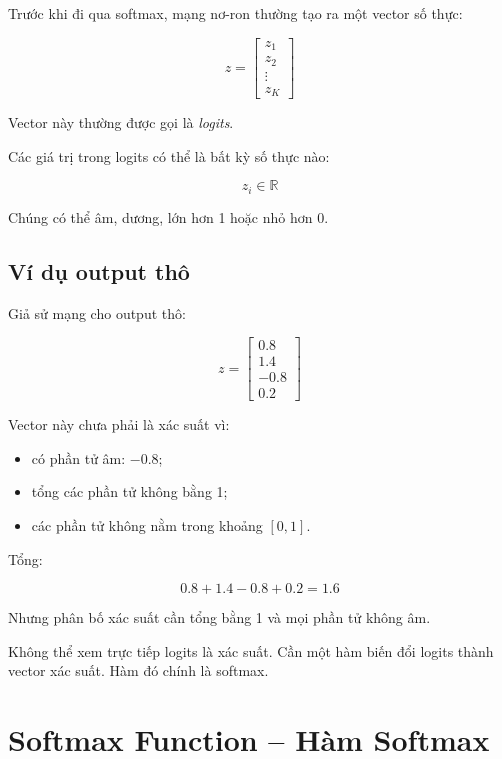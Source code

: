 Trước khi đi qua softmax, mạng nơ-ron thường tạo ra một vector số thực:

\[
    z =
    \begin{bmatrix}
    z_1\\
    z_2\\
    \vdots\\
    z_K
    \end{bmatrix}
\]

Vector này thường được gọi là \textit{logits}.

Các giá trị trong logits có thể là bất kỳ số thực nào:

\[
    z_i \in \mathbb{R}
\]

Chúng có thể âm, dương, lớn hơn 1 hoặc nhỏ hơn 0.

\subsection{Ví dụ output thô}

Giả sử mạng cho output thô:

\[
    z =
    \begin{bmatrix}
    0.8\\
    1.4\\
    -0.8\\
    0.2
    \end{bmatrix}
\]

Vector này chưa phải là xác suất vì:

\begin{itemize}
    \item có phần tử âm: $-0.8$;
    \item tổng các phần tử không bằng 1;
    \item các phần tử không nằm trong khoảng $[0,1]$.
\end{itemize}

Tổng:

\[
    0.8 + 1.4 - 0.8 + 0.2 = 1.6
\]

Nhưng phân bố xác suất cần tổng bằng 1 và mọi phần tử không âm.

\begin{canhbao}
Không thể xem trực tiếp logits là xác suất. Cần một hàm biến đổi logits thành vector xác suất. Hàm đó chính là softmax.
\end{canhbao}

\section{Softmax Function -- Hàm Softmax}

